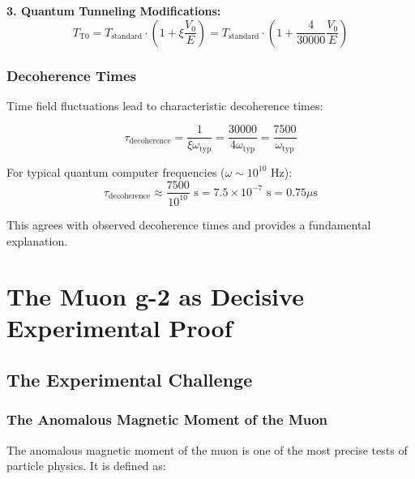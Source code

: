 \documentclass[12pt,a4paper]{report}
\newcommand{\xipar}{\xi}      %
\begin{document}
	\textbf{3. Quantum Tunneling Modifications:}
	\begin{equation}
		T_{\text{T0}} = T_{\text{standard}} \cdot \left(1 + \xipar \frac{V_0}{E}\right) = T_{\text{standard}} \cdot \left(1 + \frac{4}{30000} \frac{V_0}{E}\right)
	\end{equation}
	
	\subsection{Decoherence Times}\label{subsec:decoherence_times}
	
	Time field fluctuations lead to characteristic decoherence times:
	
	\begin{equation}\label{eq:decoherence_time}
		\tau_{\text{decoherence}} = \frac{1}{\xipar \omega_{\text{typ}}} = \frac{30000}{4 \omega_{\text{typ}}} = \frac{7500}{\omega_{\text{typ}}}
	\end{equation}
	
	For typical quantum computer frequencies ($\omega \sim 10^{10}$ Hz):
	\begin{equation}
		\tau_{\text{decoherence}} \approx \frac{7500}{10^{10}} \text{ s} = 7.5 \times 10^{-7} \text{ s} = 0.75 \mu\text{s}
	\end{equation}
	
	This agrees with observed decoherence times and provides a fundamental explanation.
	\chapter{The Muon g-2 as Decisive Experimental Proof}\label{chap:muon_g2}
	
	\section{The Experimental Challenge}\label{sec:muon_g2_experiment}
	
	\subsection{The Anomalous Magnetic Moment of the Muon}\label{subsec:anomalous_magnetic_moment}
	
	The anomalous magnetic moment of the muon is one of the most precise tests of particle physics. It is defined as:
	
\end{document}
